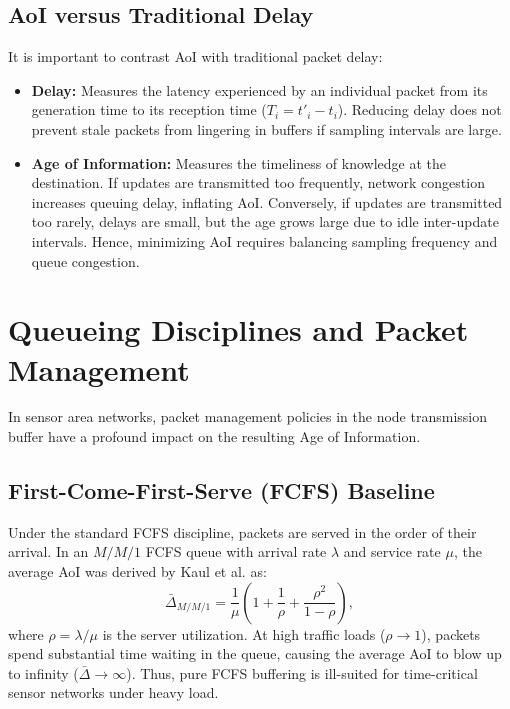 \subsection{AoI versus Traditional Delay}
It is important to contrast AoI with traditional packet delay:
\begin{itemize}
    \item \textbf{Delay:} Measures the latency experienced by an individual packet from its generation time to its reception time ($T_i = t'_i - t_i$). Reducing delay does not prevent stale packets from lingering in buffers if sampling intervals are large.
    \item \textbf{Age of Information:} Measures the timeliness of knowledge at the destination. If updates are transmitted too frequently, network congestion increases queuing delay, inflating AoI. Conversely, if updates are transmitted too rarely, delays are small, but the age grows large due to idle inter-update intervals. Hence, minimizing AoI requires balancing sampling frequency and queue congestion.
\end{itemize}

\section{Queueing Disciplines and Packet Management}
\label{sec:aoi_queueing_disciplines}

In sensor area networks, packet management policies in the node transmission buffer have a profound impact on the resulting Age of Information.

\subsection{First-Come-First-Serve (FCFS) Baseline}
Under the standard FCFS discipline, packets are served in the order of their arrival. In an $M/M/1$ FCFS queue with arrival rate $\lambda$ and service rate $\mu$, the average AoI was derived by Kaul et al. as:
\begin{equation}
    \bar{\Delta}_{M/M/1} = \frac{1}{\mu} \left( 1 + \frac{1}{\rho} + \frac{\rho^2}{1 - \rho} \right),
\end{equation}
where $\rho = \lambda/\mu$ is the server utilization. At high traffic loads ($\rho \to 1$), packets spend substantial time waiting in the queue, causing the average AoI to blow up to infinity ($\bar{\Delta} \to \infty$). Thus, pure FCFS buffering is ill-suited for time-critical sensor networks under heavy load.


